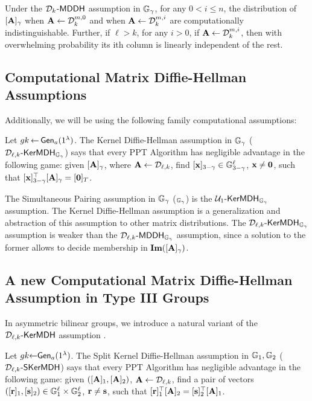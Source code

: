 \begin{lemma} Under the $\mathcal{D}_{k}$-$\mathsf{MDDH}$ assumption in $\mathbb{G}_\gamma$, for any $0 < i \leq n$, the distribution of  $[\mathbf{{A}}]_\gamma$ when $\mathbf{{A}} \leftarrow \mathcal{D}_k^{m,0}$ and when $\mathbf{{A}} \leftarrow \mathcal{D}_k^{m,i}$ are computationally indistinguishable. Further, if $\ell>k$, for any $i>0$, if $\mathbf{{A}} \leftarrow \mathcal{D}_k^{m,i}$, then with overwhelming probability its ith column is linearly independent of the rest. \label{lemma:dist-i}
\end{lemma}

\subsection{Computational Matrix Diffie-Hellman Assumptions}
Additionally, we will be using the following family  computational assumptions:
\begin{definition}Let  ${gk} 
\hspace*{-1pt}
\gets
\hspace*{-1pt}
\mathsf{Gen}_a(1^\lambda)$.
The Kernel Diffie-Hellman assumption in $\mathbb{G}_\gamma$  ($\mathcal{D}_{\ell,k}\mbox{-}\mathsf{KerMDH}_{\mathbb{G}_\gamma}$) says that every PPT Algorithm has negligible advantage in the following  game: given $[\mathbf{{A}}]_\gamma$, where $\mathbf{{A}} \gets \mathcal{D}_{\ell,k}$, find $[\mathbf{x}]_{3-\gamma} \in \mathbb{G}_{3-\gamma}^{\ell}$, $\mathbf{x} \neq \mathbf{0}$, such that 
$[\mathbf{x}]_{3-\gamma}^{\top}[\mathbf{{A}}]_{\gamma}=[\mathbf{0}]_T$. 
\end{definition}
The  Simultaneous Pairing assumption in $\mathbb{G}_\gamma$  (\SP$_{\mathbb{G}_{\gamma}}$) is the $ \mathcal{U}_1\mbox{-}\mathsf{KerMDH}_{\mathbb{G}_{\gamma}}$ assumption. The Kernel Diffie-Hellman assumption is a generalization and abstraction of this assumption to other matrix distributions. 
The $\mathcal{D}_{\ell,k}\mbox{-}\mathsf{KerMDH}_{\mathbb{G}_{\gamma}}$ assumption is weaker than the $\mathcal{D}_{\ell,k}\mbox{-}\mathsf{MDDH}_{\mathbb{G}_{\gamma}}$ assumption, since a solution to the former allows to decide membership in $\mathbf{Im}([\mathbf{{A}}]_{\gamma})$.

\subsection{A new Computational Matrix Diffie-Hellman Assumption in Type III Groups}

In asymmetric bilinear groups, we introduce a natural variant of the $\mathcal{D}_{\ell,k}\mbox{-}\mathsf{KerMDH}$ assumption \cite{AC:GonHevRaf15}.  
\begin{definition}
Let  ${gk} \hspace*{-3pt} \gets
\hspace*{-3pt}
\mathsf{Gen}_a(1^\lambda)$.
The Split Kernel Diffie-Hellman assumption in $\mathbb{G}_1,\mathbb{G}_2$  ($\mathcal{D}_{\ell,k}\mbox{-}\mathsf{SKerMDH}$) says that every PPT Algorithm has negligible advantage in the following  game: given $([\mathbf{{A}}]_1,[\mathbf{{A}}]_2)$, $\mathbf{{A}} \leftarrow \mathcal{D}_{\ell,k}$, find a pair of vectors $([\mathbf{r}]_1,[\mathbf{s}]_2) \in \mathbb{G}_1^{\ell} \times \mathbb{G}_2^{\ell}$, $\mathbf{r} \neq \mathbf{s}$, such that 
$[\mathbf{r}]_1^{\top}[\mathbf{{A}}]_2=[\mathbf{s}]_2^{\top}[\mathbf{{A}}]_1$. 
\end{definition}

